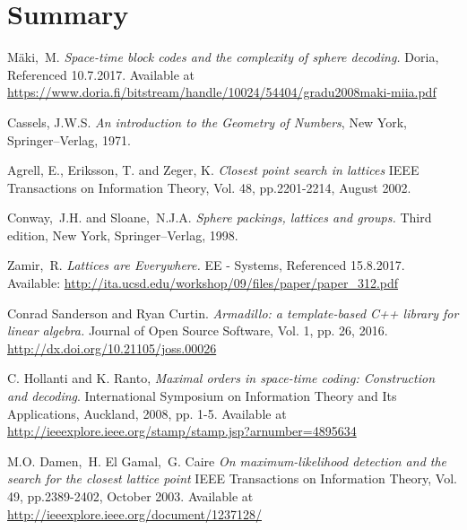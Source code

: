 \documentclass[english,12pt,a4paper,pdftex,sci,utf8]{aaltothesis}
\begin{document}
\clearpage

\section{Summary}


\clearpage

{}
\begin{thebibliography}{99}

 Mäki,\ M. \textit{Space-time block codes and the complexity of sphere decoding.} Doria, Referenced 10.7.2017. Available at
  \url{https://www.doria.fi/bitstream/handle/10024/54404/gradu2008maki-miia.pdf}
   
 Cassels, J.W.S. \textit{An introduction to the Geometry of Numbers}, New York, Springer--Verlag, 1971.

 Agrell, E., Eriksson, T. and Zeger, K. \textit{Closest point search in lattices} IEEE Transactions on Information Theory, Vol. 48, pp.2201-2214,
August 2002.

 Conway,\ J.H. and Sloane,\ N.J.A. \textit{Sphere packings, lattices and groups.} Third edition, New York, Springer--Verlag, 1998.

 Zamir,\ R. \textit{Lattices are Everywhere.} EE - Systems, Referenced 15.8.2017. Available: \url{http://ita.ucsd.edu/workshop/09/files/paper/paper_312.pdf}

 Conrad Sanderson and Ryan Curtin.
\textit{Armadillo: a template-based C++ library for linear algebra.}
Journal of Open Source Software, Vol. 1, pp. 26, 2016.
\url{http://dx.doi.org/10.21105/joss.00026}

 C. Hollanti and K. Ranto, \textit{Maximal orders in space-time coding: Construction and decoding}. International Symposium on Information Theory and Its Applications, Auckland, 2008, pp. 1-5. Available at \url{http://ieeexplore.ieee.org/stamp/stamp.jsp?arnumber=4895634}

 M.O. Damen,\ H. El Gamal,\ G. Caire \emph{On maximum-likelihood detection and the search for the closest lattice point} IEEE Transactions on Information Theory, Vol. 49, pp.2389-2402, October 2003. Available at \url{http://ieeexplore.ieee.org/document/1237128/}



\end{thebibliography}
\end{document}
